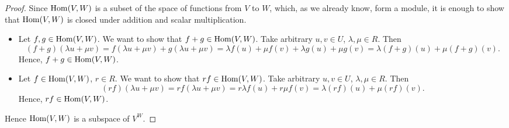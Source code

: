 \begin{proof}
  Since $\mathop{\rm Hom}\nolimits(V, W)$ is a subset of the space of functions from $V$ to $W$,
  which, as we already know, form a module, it is enough to show that
  $\mathop{\rm Hom}\nolimits(V, W)$ is closed under addition and scalar multiplication.
  \begin{itemize}
    \item
      Let $f, g \in \mathop{\rm Hom}\nolimits(V, W)$.
      We want to show that $f + g \in \mathop{\rm Hom}\nolimits(V, W)$.
      Take arbitrary $u, v \in U$, $\lambda, \mu \in R$.
      Then
      \begin{equation}
        (f + g)(\lambda u + \mu v)
        = f(\lambda u + \mu v) + g(\lambda u + \mu v)
        = \lambda f(u) + \mu f(v) + \lambda g(u) + \mu g(v)
        = \lambda (f + g)(u) + \mu (f + g)(v).
      \end{equation}
      Hence, $f + g \in \mathop{\rm Hom}\nolimits(V, W)$.
    \item
      Let $f \in \mathop{\rm Hom}\nolimits(V, W)$, $r \in R$.
      We want to show that $r f \in \mathop{\rm Hom}\nolimits(V, W)$.
      Take arbitrary $u, v \in U$, $\lambda, \mu \in R$.
      Then
      \begin{equation}
        (r f)(\lambda u + \mu v)
        = r f(\lambda u + \mu v)
        = r \lambda f(u) + r \mu f(v)
        = \lambda (r f)(u) + \mu (r f)(v).
      \end{equation}
      Hence, $r f\in \mathop{\rm Hom}\nolimits(V, W)$.
  \end{itemize}
  Hence $\mathop{\rm Hom}\nolimits(V, W)$ is a subspace of $V^W$.
\end{proof}
